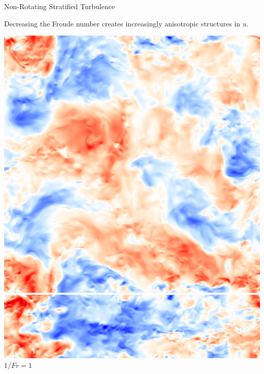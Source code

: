 \documentclass[aspecttatio=169]{beamer}
\begin{document}
\begin{frame}{Non-Rotating Stratified Turbulence}
    \centering

    Decreasing the Froude number creates increasingly anisotropic structures in
    $u$. 

    \vspace{5pt}

        \centering
       
        \includegraphics[width=\textwidth]{images/XYB1ux.png}
        \includegraphics[width=\textwidth]{images/XZB1ux.png}
        \vspace{2pt}
        $1/Fr = 1$
    \emp
    \hspace{1pt}
        \centering
        

\end{frame}
\end{document}
